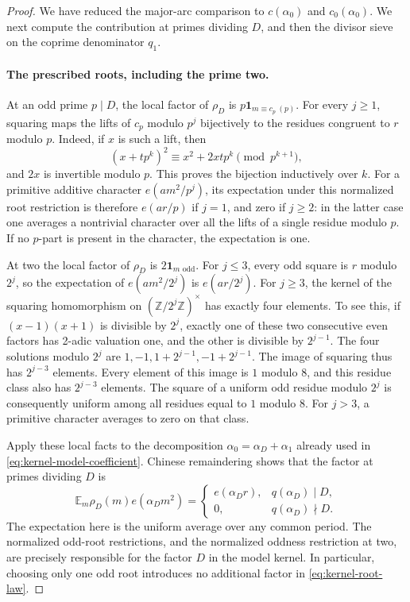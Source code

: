\begin{proof}
We have reduced the major-arc comparison to $c(\alpha_0)$ and
$c_0(\alpha_0)$. We next compute the contribution at primes dividing
$D$, and then the divisor sieve on the coprime denominator $q_1$.

\paragraph{The prescribed roots, including the prime two.}
At an odd prime $p\mid D$, the local factor of $\rho_D$ is
$p\mathbf1_{m\equiv c_p\ (p)}$.
For every $j\ge1$, squaring maps the lifts of $c_p$ modulo $p^j$
bijectively to the residues congruent to $r$ modulo $p$.
Indeed, if $x$ is such a lift, then
\[
 (x+tp^k)^2\equiv x^2+2xtp^k\pmod {p^{k+1}},
\]
and $2x$ is invertible modulo $p$. This proves the bijection
inductively over $k$.
For a primitive additive character $e(am^2/p^j)$, its expectation
under this normalized root restriction is therefore $e(ar/p)$ if
$j=1$, and zero if $j\ge2$: in the latter case one averages a
nontrivial character over all the lifts of a single residue modulo $p$.
If no $p$-part is present in the character, the expectation is one.

At two the local factor of $\rho_D$ is $2\mathbf1_{m\text{ odd}}$.
For $j\le3$, every odd square is $r$ modulo $2^j$, so the expectation
of $e(am^2/2^j)$ is $e(ar/2^j)$.
For $j\ge3$, the kernel of the squaring homomorphism on
$(\mathbb Z/2^j\mathbb Z)^\times$ has exactly four elements.
To see this, if $(x-1)(x+1)$ is divisible by $2^j$, exactly one of
these two consecutive even factors has 2-adic valuation one, and
the other is divisible by $2^{j-1}$.
The four solutions modulo $2^j$ are
$1,-1,1+2^{j-1},-1+2^{j-1}$.
The image of squaring thus has $2^{j-3}$ elements.
Every element of this image is $1$ modulo $8$, and this residue class
also has $2^{j-3}$ elements. The square of a uniform odd residue
modulo $2^j$ is consequently uniform among all residues equal to
$1$ modulo $8$. For $j>3$, a primitive character averages to zero
on that class.

Apply these local facts to the decomposition
$\alpha_0=\alpha_D+\alpha_1$ already used in
\eqref{eq:kernel-model-coefficient}. Chinese remaindering shows that
the factor at primes dividing $D$ is
\begin{equation}
 \mathbb E_m\rho_D(m)e(\alpha_Dm^2)
 =\begin{cases}
   e(\alpha_Dr),&q(\alpha_D)\mid D,\\
   0,&q(\alpha_D)\nmid D.
  \end{cases}
 \label{eq:kernel-root-law}
\end{equation}
The expectation here is the uniform average over any common period.
The normalized odd-root restrictions, and the normalized oddness
restriction at two, are precisely responsible for the factor $D$
in the model kernel. In particular, choosing only one odd root
introduces no additional factor in \eqref{eq:kernel-root-law}.


\end{proof}
